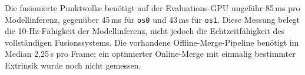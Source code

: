 Die fusionierte Punktwolke benötigt auf der Evaluations-GPU ungefähr 85\,ms pro Modellinferenz, gegenüber 45\,ms für \texttt{os0} und 43\,ms für \texttt{os1}. Diese Messung belegt die 10-Hz-Fähigkeit der Modellinferenz, nicht jedoch die Echtzeitfähigkeit des vollständigen Fusionssystems. Die vorhandene Offline-Merge-Pipeline benötigt im Median 2{,}25\,s pro Frame; ein optimierter Online-Merge mit einmalig bestimmter Extrinsik wurde noch nicht gemessen.
